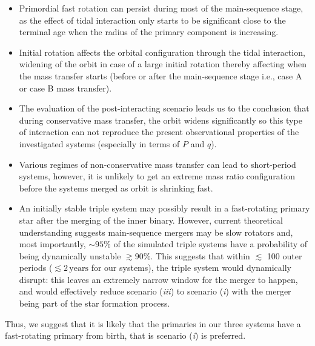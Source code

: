 \documentclass{aa}
\begin{document}
\begin{itemize}
  \item Primordial fast rotation can persist during most of the main-sequence stage, as the effect of tidal interaction only starts to be significant close to the terminal age when the radius of the primary component is increasing.
  \item Initial rotation affects the orbital configuration through the tidal interaction, widening of the orbit in case of a large initial rotation thereby affecting when the mass transfer starts (before or after the main-sequence stage i.e., case A or case B mass transfer).
  \item The evaluation of the post-interacting scenario leads us to the conclusion that during conservative mass transfer, the orbit widens significantly so this type of interaction can not reproduce the present observational properties of the investigated systems (especially in terms of $P$ and $q$).
  \item Various regimes of non-conservative mass transfer can lead to
    short-period systems, however, it is unlikely to get an extreme mass ratio configuration before the systems merged as orbit is shrinking fast.
  \item An initially stable triple system may possibly result in a
    fast-rotating primary star after the merging of the inner binary.
    However, current theoretical understanding suggests
      main-sequence mergers may be slow rotators and, most
      importantly, $\sim95\%$ of the simulated triple systems have a probability of being
      dynamically unstable $\gtrsim 90\%$. This suggests that within
      $\lesssim$ 100 outer periods ($\lesssim 2\,\mathrm{years}$ for
      our systems), the triple system would dynamically disrupt: this leaves
      an extremely narrow window for the merger to happen, and would
      effectively reduce scenario (\emph{iii}) to scenario (\emph{i}) with the merger
      being part of the star formation process. %
\end{itemize}

Thus, we suggest that it is likely that the primaries in our three
systems have a fast-rotating primary from birth, that is scenario (\emph{i})
is preferred.
\end{document}
